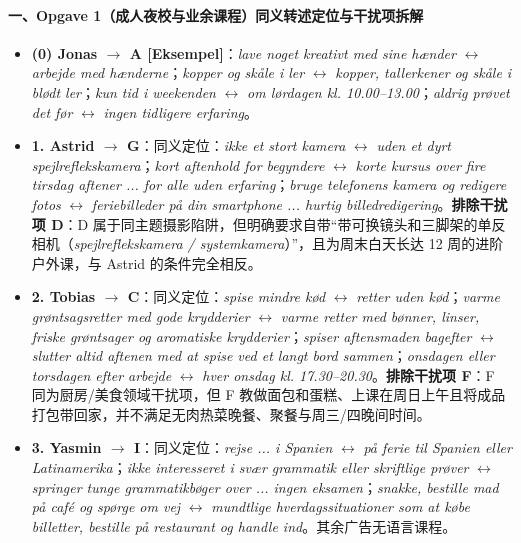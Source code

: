 \paragraph*{一、Opgave 1（成人夜校与业余课程）同义转述定位与干扰项拆解}
\begin{itemize}
  \item \textbf{(0) Jonas $\rightarrow$ A [Eksempel]}：\textit{lave noget kreativt med sine hænder} $\leftrightarrow$ \textit{arbejde med hænderne}；\textit{kopper og skåle i ler} $\leftrightarrow$ \textit{kopper, tallerkener og skåle i blødt ler}；\textit{kun tid i weekenden} $\leftrightarrow$ \textit{om lørdagen kl. 10.00--13.00}；\textit{aldrig prøvet det før} $\leftrightarrow$ \textit{ingen tidligere erfaring}。
  \item \textbf{1. Astrid $\rightarrow$ G}：同义定位：\textit{ikke et stort kamera} $\leftrightarrow$ \textit{uden et dyrt spejlreflekskamera}；\textit{kort aftenhold for begyndere} $\leftrightarrow$ \textit{korte kursus over fire tirsdag aftener ... for alle uden erfaring}；\textit{bruge telefonens kamera og redigere fotos} $\leftrightarrow$ \textit{feriebilleder på din smartphone ... hurtig billedredigering}。\textbf{排除干扰项 D}：D 属于同主题摄影陷阱，但明确要求自带“带可换镜头和三脚架的单反相机（\textit{spejlreflekskamera / systemkamera}）”，且为周末白天长达 12 周的进阶户外课，与 Astrid 的条件完全相反。
  \item \textbf{2. Tobias $\rightarrow$ C}：同义定位：\textit{spise mindre kød} $\leftrightarrow$ \textit{retter uden kød}；\textit{varme grøntsagsretter med gode krydderier} $\leftrightarrow$ \textit{varme retter med bønner, linser, friske grøntsager og aromatiske krydderier}；\textit{spiser aftensmaden bagefter} $\leftrightarrow$ \textit{slutter altid aftenen med at spise ved et langt bord sammen}；\textit{onsdagen eller torsdagen efter arbejde} $\leftrightarrow$ \textit{hver onsdag kl. 17.30--20.30}。\textbf{排除干扰项 F}：F 同为厨房/美食领域干扰项，但 F 教做面包和蛋糕、上课在周日上午且将成品打包带回家，并不满足无肉热菜晚餐、聚餐与周三/四晚间时间。
  \item \textbf{3. Yasmin $\rightarrow$ I}：同义定位：\textit{rejse ... i Spanien} $\leftrightarrow$ \textit{på ferie til Spanien eller Latinamerika}；\textit{ikke interesseret i svær grammatik eller skriftlige prøver} $\leftrightarrow$ \textit{springer tunge grammatikbøger over ... ingen eksamen}；\textit{snakke, bestille mad på café og spørge om vej} $\leftrightarrow$ \textit{mundtlige hverdagssituationer som at købe billetter, bestille på restaurant og handle ind}。其余广告无语言课程。

\end{itemize}
